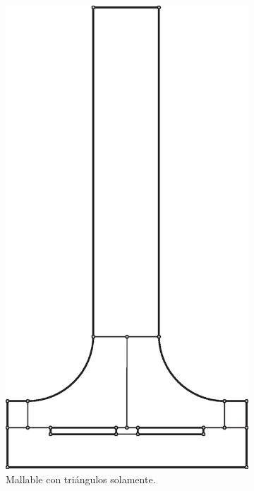 \begin{figure}[htb!]
	\centering
	\begin{subfigure}{0.49\textwidth}
		\centering
		\includegraphics[width=.7\linewidth]{fig/divisionPelton1.eps}
		\caption{Mallable con triángulos solamente.}
	\end{subfigure}
	\begin{subfigure}{0.49\textwidth}
		\centering

\end{subfigure}
\end{figure}
